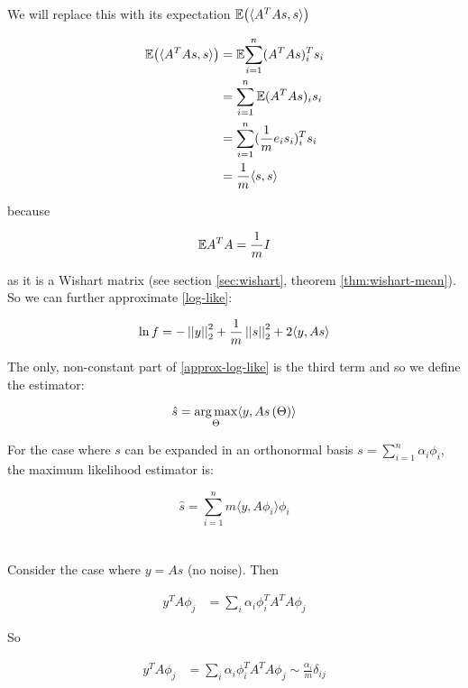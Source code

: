 We will replace this with its expectation \({\mathbb{E}}{\left( \langle A^T As, s\rangle \right)}\)

\begin{align*}
{\mathbb{E}}{\left(\langle A^T As, s\rangle\right)} &=  {\mathbb{E}}{\sum_{i=1}^n (A^TAs)^T_i s_i} \\
&= \sum_{i=1}^n {\mathbb{E}}{(A^TAs)_i s_i} \\
&= \sum_{i=1}^n (\frac{1}{m}e_i s_i)^T_i s_i \\
&= \frac{1}{m} \langle s, s \rangle
\end{align*}

because

\begin{equation}
{\mathbb{E}}{A^TA} = \frac{1}{m}I
\end{equation}

as it is a Wishart matrix (see section \ref{sec:wishart}, theorem \eqref{thm:wishart-mean}). 
\\
So we can further approximate \eqref{log-like}:

\begin{equation}
\ln{f} = - \left|\left|y\right|\right|_2^2 + \frac{1}{m}\left|\left|s\right|\right|_2^2 + 2\langle y, As \rangle
\label{approx-log-like}
\end{equation}

The only, non-constant part of \eqref{approx-log-like} is the third term and so we define the estimator:

\begin{equation}
\hat{s} = \operatorname*{arg\,max}_{\Theta} \langle y , As\left(\Theta\right)\rangle
\label{eq: compressive-estimator}
\end{equation}

For the case where \(s\) can be expanded in an orthonormal basis \(s = \sum_{i=1}^n \alpha_i\phi_i\), the maximum likelihood estimator is:

\begin{equation}
\hat{s} = \sum_{i=1}^n m\langle y, A\phi_i\rangle \phi_i
\end{equation}
\\
\\
Consider the case where \( y = As\) (no noise). Then

\begin{align*}
y^TA\phi_j &= \sum_i \alpha_i \phi_i^TA^TA\phi_j
\end{align*}

So 

\begin{align*}
y^TA\phi_j &= \sum_i \alpha_i \phi_i^TA^TA\phi_j \sim \frac{\alpha_i}{m} \delta_{ij}
\end{align*}

